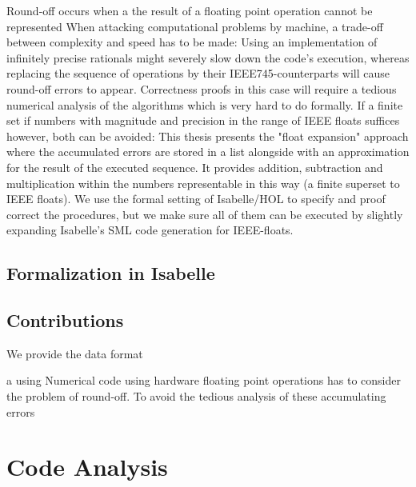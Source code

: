 \documentclass[11pt,a4paper]{article}
\begin{document}
Round-off occurs when a the result of a floating point operation cannot be represented 
When attacking computational problems by machine, a trade-off between complexity and speed has to be made: Using an implementation of infinitely precise rationals might severely slow down the code's execution, whereas replacing the sequence of operations by their IEEE745-counterparts will cause round-off errors to appear. Correctness proofs in this case will require a tedious numerical analysis of the algorithms which is very hard to do formally. If a finite set if numbers with magnitude and precision in the range of IEEE floats suffices however, both can be avoided: This thesis presents the "float expansion" approach where the accumulated errors are stored in a list alongside with an approximation for the result of the executed sequence. It provides addition, subtraction and multiplication within the numbers representable in this way (a finite superset to IEEE floats). We use the formal setting of Isabelle/HOL to specify and proof correct the procedures, but we make sure all of them can be executed by slightly expanding Isabelle's SML code generation for IEEE-floats.

\subsection{Formalization in Isabelle}
\subsection{Contributions}
We provide the data format \typmpf

a using Numerical code using hardware floating point operations has to consider the problem of round-off. To avoid the tedious analysis of these accumulating errors

\section{Code Analysis}
\end{document}
